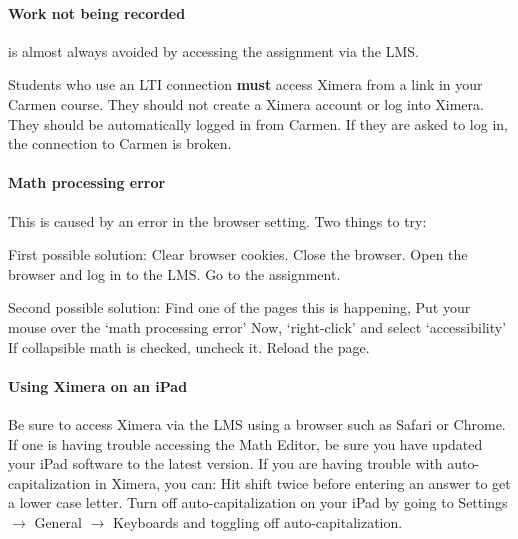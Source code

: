 \documentclass{ximera}
\begin{document}
\paragraph{Work not being recorded} is almost always avoided by accessing the assignment via the LMS.

\begin{warning}
    Students who use an LTI connection \textbf{must} access Ximera from a link in your Carmen course.
They should not create a Ximera account or log into Ximera. They should be
automatically logged in from Carmen. If they are asked to log in, the connection
to Carmen is broken.
\end{warning}



\paragraph{Math processing error}

This is caused by an error in the browser setting. Two things to try:

First possible solution: Clear browser cookies. Close the browser.
Open the browser and log in to the LMS. Go to the assignment.



Second possible solution:
Find one of the pages this is happening,
Put your mouse over the `math processing error'
Now, `right-click' and select `accessibility' If collapsible math is
checked, uncheck it. Reload the page.

\paragraph{Using Ximera on an iPad}

Be sure to access Ximera via the LMS using a browser such as Safari or Chrome.
If one is having trouble accessing the Math Editor, be sure you have
updated your iPad software to the latest version.
If you are having trouble with auto-capitalization in Ximera, you can:
Hit shift twice before entering an answer to get a lower case letter.
Turn off auto-capitalization on your iPad by going to Settings $\to$ General
$\to$ Keyboards and toggling off auto-capitalization.
\end{document}
